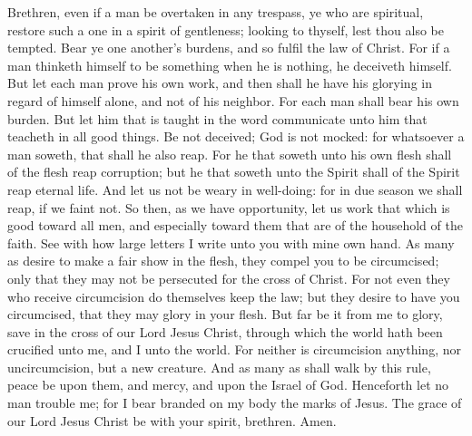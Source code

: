 Brethren, even if a man be overtaken in any trespass, ye who are spiritual, restore such a one in a spirit of gentleness; looking to thyself, lest thou also be tempted. Bear ye one another’s burdens, and so fulfil the law of Christ. For if a man thinketh himself to be something when he is nothing, he deceiveth himself. But let each man prove his own work, and then shall he have his glorying in regard of himself alone, and not of his neighbor. For each man shall bear his own burden.  But let him that is taught in the word communicate unto him that teacheth in all good things. Be not deceived; God is not mocked: for whatsoever a man soweth, that shall he also reap. For he that soweth unto his own flesh shall of the flesh reap corruption; but he that soweth unto the Spirit shall of the Spirit reap eternal life. And let us not be weary in well-doing: for in due season we shall reap, if we faint not. So then, as we have opportunity, let us work that which is good toward all men, and especially toward them that are of the household of the faith.  See with how large letters I write unto you with mine own hand. As many as desire to make a fair show in the flesh, they compel you to be circumcised; only that they may not be persecuted for the cross of Christ. For not even they who receive circumcision do themselves keep the law; but they desire to have you circumcised, that they may glory in your flesh. But far be it from me to glory, save in the cross of our Lord Jesus Christ, through which the world hath been crucified unto me, and I unto the world. For neither is circumcision anything, nor uncircumcision, but a new creature. And as many as shall walk by this rule, peace be upon them, and mercy, and upon the Israel of God.  Henceforth let no man trouble me; for I bear branded on my body the marks of Jesus.  The grace of our Lord Jesus Christ be with your spirit, brethren. Amen. 